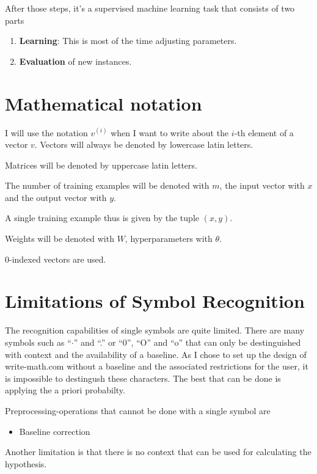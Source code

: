 After those steps, it's a supervised machine learning task that consists of
two parts

\begin{enumerate}
    \item \textbf{Learning}: This is most of the time adjusting parameters.
    \item \textbf{Evaluation} of new instances.
\end{enumerate}

\section{Mathematical notation}
I will use the notation $v^{(i)}$ when I want to write about the $i$-th element
of a vector $v$. Vectors will always be denoted by lowercase latin letters.

Matrices will be denoted by uppercase latin letters.

The number of training examples will be denoted with $m$, the input vector with
$x$ and the output vector with $y$.

A single training example thus is given by the tuple $(x, y)$.

Weights will be denoted with $W$, hyperparameters with $\theta$.

0-indexed vectors are used.

\section{Limitations of Symbol Recognition}
The recognition capabilities of single symbols are quite limited. There are
many symbols such as \enquote{$\cdot$} and \enquote{.} or \enquote{0}, \enquote{O}
and \enquote{o} that can only be destinguished with context and the availability
of a baseline. As I chose to set up the design of write-math.com without a
baseline and the associated %
restrictions for the user, it is impossible to destingush these characters.
The best that can be done is applying the a priori probabilty.

Preprocessing-operations that cannot be done with a single symbol are

\begin{itemize}
    \item Baseline correction
\end{itemize}

Another limitation is that there is no context that can be used for calculating
the hypothesis.

